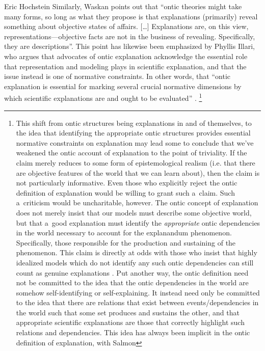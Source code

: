 \begin{artengenv}{Eric Hochstein}
Similarly, Waskan
\parencite*[][p.4]{waskan_intelligibility_2011} %
 points out that ``ontic theories might take many forms, so long as what they propose is that explanations (primarily) reveal something about objective states of affairs. […] Explanations are, on this view, representations---objective facts are not in the business of revealing. Specifically, they are descriptions''. This point has likewise been emphasized by Phyllis Illari, who argues that advocates of ontic explanation acknowledge the essential role that representation and modeling plays in scientific explanation, and that the issue instead is one of normative constraints. In other words, that ``ontic explanation is essential for marking several crucial normative dimensions by which scientific explanations are and ought to be evaluated'' 
\parencite[][p.243]{illari_mechanistic_2013}.%
\footnote{This shift from ontic structures being explanations in and of themselves, to the idea that identifying the appropriate ontic structures provides essential normative constraints on explanation may lead some to conclude that we've weakened the ontic account of explanation to the point of triviality. If the claim merely reduces to some form of epistemological realism (i.e. that there are objective features of the world that we can learn about), then the claim is not particularly informative. Even those who explicitly reject the ontic definition of explanation would be willing to grant such a~claim. Such a~criticism would be uncharitable, however. The ontic concept of explanation does not merely insist that our models must describe some objective world, but that a~good explanation must identify the \textit{appropriate} ontic dependencies in the world necessary to account for the explanandum phenomenon. Specifically, those responsible for the production and sustaining of the phenomenon. This claim is directly at odds with those who insist that highly idealized models which do not identify any such ontic dependencies can still count as genuine explanations 
\parencites[e.g.][]{batterman_devil_2002}[][]{batterman_minimal_2014}[][]{chirimuuta_minimal_2014}[][]{rice_moving_2015}[][]{rice_how_2020}. %
 Put another way, the ontic definition need not be committed to the idea that the ontic dependencies in the world are somehow self-identifying or self-explaining. It instead need only be committed to the idea that there are relations that exist between events/dependencies in the world such that some set produces and sustains the other, and that appropriate scientific explanations are those that correctly highlight such relations and dependencies. This idea has always been implicit in the ontic definition of explanation, with Salmon 
}
\end{artengenv}
